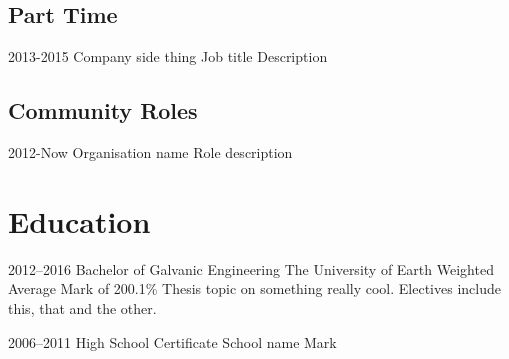 \documentclass[]{friggeri-cv}
\begin{document}
\subsection{Part Time}

\begin{entrylist}


\entry
{2013-2015}
{Company} 
{side thing}
{Job title}
{ 
Description
}




\end{entrylist}




\subsection{Community Roles}

\begin{entrylist}


\entry
{2012-Now}
{Organisation name} 
{}
{Role}
{
description
}




\end{entrylist}


\section{Education}

\begin{entrylist} 


\entry
{2012--2016}
{Bachelor {\normalfont of Galvanic Engineering}}
{The University of Earth}
{Weighted Average Mark of 200.1\%}
{
Thesis topic on something really cool. Electives include this, that and the other.
}


\entry
{2006--2011}  
{High School Certificate}
{School name}
{Mark} 
{
}


\end{entrylist}
\end{document}
